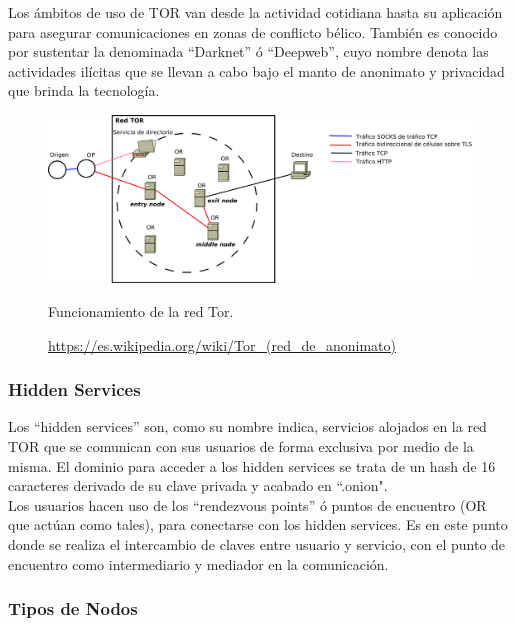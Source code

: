 
Los ámbitos de uso de TOR van desde la actividad cotidiana hasta su aplicación para asegurar comunicaciones en zonas de conflicto bélico. También es conocido por sustentar la denominada \hyphenquote{spanish}{Darknet} ó \hyphenquote{spanish}{Deepweb}, cuyo nombre denota las actividades ilícitas que se llevan a cabo bajo el manto de anonimato y privacidad que brinda la tecnología. \\

\begin{figure}[H]
	\centering
	\includegraphics[width=\textwidth]{imagenes/funcionamiento_tor}
	\caption{Funcionamiento de la red Tor.}
	\caption*{\small \url {https://es.wikipedia.org/wiki/Tor_(red_de_anonimato)}}
	\label{fig:redtor}
\end{figure}

\subsubsection {Hidden Services}

Los \hyphenquote{spanish}{hidden services} son, como su nombre indica, servicios alojados en la red TOR que se comunican con sus usuarios de forma exclusiva por medio de la misma. El dominio para acceder a los hidden services se trata de un hash de 16 caracteres derivado de su clave privada y acabado en ``.onion". \\

Los usuarios hacen uso de los \hyphenquote{spanish}{rendezvous points} ó puntos de encuentro (OR que actúan como tales), para conectarse con los hidden services. Es en este punto donde se realiza el intercambio de claves entre usuario y servicio, con el punto de encuentro como intermediario y mediador en la comunicación. \\ 


\subsubsection {Tipos de Nodos}

